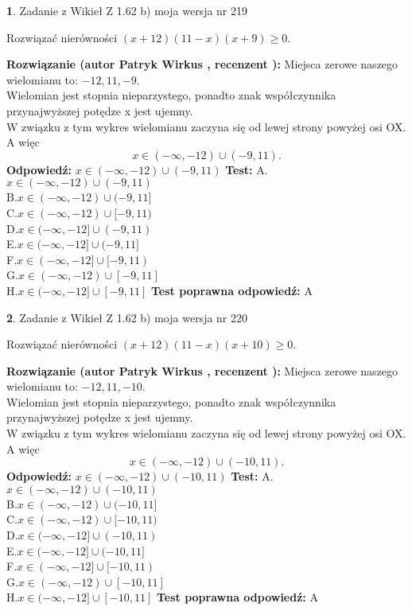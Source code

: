 \documentclass[12pt, a4paper]{article}
\theoremstyle{definition} %
\newtheorem{zad}{}
\newcommand{\zadStart}[1]{\begin{zad}#1\newline}
\newcommand{\zadStop}{\end{zad}}
\newcommand{\rozwStart}[2]{\noindent \textbf{Rozwiązanie (autor #1 , recenzent #2): }\newline}
\newcommand{\rozwStop}{\newline}
\newcommand{\odpStart}{\noindent \textbf{Odpowiedź:}\newline}
\newcommand{\odpStop}{\newline}
\newcommand{\testStart}{\noindent \textbf{Test:}\newline}
\newcommand{\testStop}{\newline}
\newcommand{\kluczStart}{\noindent \textbf{Test poprawna odpowiedź:}\newline}
\newcommand{\kluczStop}{\newline}
\begin{document}
\zadStart{Zadanie z Wikieł Z 1.62 b) moja wersja nr 219}

Rozwiązać nierówności $(x+12)(11-x)(x+9)\ge0$.
\zadStop
\rozwStart{Patryk Wirkus}{}
Miejsca zerowe naszego wielomianu to: $-12, 11, -9$.\\
Wielomian jest stopnia nieparzystego, ponadto znak współczynnika przy\linebreak najwyższej potędze x jest ujemny.\\ W związku z tym wykres wielomianu zaczyna się od lewej strony powyżej osi OX. A więc $$x \in (-\infty,-12) \cup (-9,11).$$
\rozwStop
\odpStart
$x \in (-\infty,-12) \cup (-9,11)$
\odpStop
\testStart
A.$x \in (-\infty,-12) \cup (-9,11)$\\
B.$x \in (-\infty,-12) \cup (-9,11]$\\
C.$x \in (-\infty,-12) \cup [-9,11)$\\
D.$x \in (-\infty,-12] \cup (-9,11)$\\
E.$x \in (-\infty,-12] \cup (-9,11]$\\
F.$x \in (-\infty,-12] \cup [-9,11)$\\
G.$x \in (-\infty,-12) \cup [-9,11]$\\
H.$x \in (-\infty,-12] \cup [-9,11]$
\testStop
\kluczStart
A
\kluczStop



\zadStart{Zadanie z Wikieł Z 1.62 b) moja wersja nr 220}

Rozwiązać nierówności $(x+12)(11-x)(x+10)\ge0$.
\zadStop
\rozwStart{Patryk Wirkus}{}
Miejsca zerowe naszego wielomianu to: $-12, 11, -10$.\\
Wielomian jest stopnia nieparzystego, ponadto znak współczynnika przy\linebreak najwyższej potędze x jest ujemny.\\ W związku z tym wykres wielomianu zaczyna się od lewej strony powyżej osi OX. A więc $$x \in (-\infty,-12) \cup (-10,11).$$
\rozwStop
\odpStart
$x \in (-\infty,-12) \cup (-10,11)$
\odpStop
\testStart
A.$x \in (-\infty,-12) \cup (-10,11)$\\
B.$x \in (-\infty,-12) \cup (-10,11]$\\
C.$x \in (-\infty,-12) \cup [-10,11)$\\
D.$x \in (-\infty,-12] \cup (-10,11)$\\
E.$x \in (-\infty,-12] \cup (-10,11]$\\
F.$x \in (-\infty,-12] \cup [-10,11)$\\
G.$x \in (-\infty,-12) \cup [-10,11]$\\
H.$x \in (-\infty,-12] \cup [-10,11]$
\testStop
\kluczStart
A
\kluczStop
\end{document}
